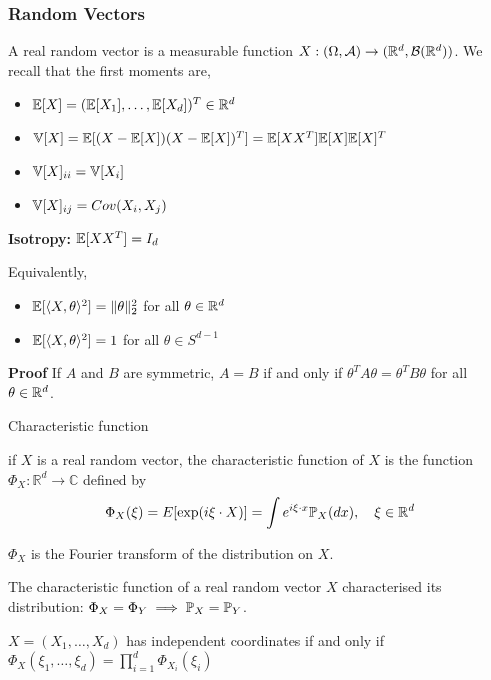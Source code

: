 \documentclass{beamer}
\begin{document}
  \begin{frame}
    \frametitle{Random Vectors}

    A real random vector is a measurable function $X:(\Omega,\cA) \to
    (\Rd,\cB(\Rd))$. We recall that the first moments are,

    \begin{itemize}
    \item $\E[X] = (\E[X_1], \ldots, \E[X_d])^T \in \Rd$
      \pause
      
    \item $\V[X] = \E[(X-\E[X])(X-\E[X])^T] =  \E[XX^T] \E[X]\E[X]^T$
      \pause
    \item $\V[X]_{ii} = \V[X_i]$
    \item $\V[X]_{ij} = Cov(X_i,X_j)$        
    \end{itemize}

    \pause

    \textbf{Isotropy:}  $\E[XX^T] = I_d$

    \pause

    Equivalently,   

    \begin{itemize}
    \item $\E[\langle X,\theta \rangle^2] = \|\theta\|_2^2$ for all $\theta \in
      \Rd$
    \item $\E[\langle X,\theta \rangle^2] = 1$ for all $\theta \in S^{d-1}$
    \end{itemize}

    \textbf{Proof} If $A$ and $B$ are symmetric, $A=B$ if and only if
    $\theta^TA\theta = \theta^TB\theta$ for all $\theta \in \Rd$.

  \end{frame}

  \begin{frame}{Characteristic function}

    \begin{definition}
      if $X$ is a real random vector, the characteristic function of $X$ is the function
      $\Phi_{X}: \mathbb{R}^{d} \longrightarrow \mathbb{C}$ defined by
      $$
      \Phi_{X}(\xi)=E[\exp (i \xi \cdot X)] = \int e^{i \xi \cdot x} \P_{X}(d x), \quad \xi \in \mathbb{R}^{d}
      $$

      $\Phi_{X}$ is the Fourier transform of the distribution on $X$.
    \end{definition}

    \pause

    \begin{theorem}
      The characteristic function of a real random vector $X$ characterised its
      distribution: $\Phi_X = \Phi_Y \implies \P_X = \P_Y$.
    \end{theorem}

    \pause

    
    \begin{proposition}
      $X=(X_1,\ldots,X_d)$ has independent coordinates if and only if \\
      $\Phi_{X}\left(\xi_{1}, \ldots, \xi_{d}\right)=\prod_{i=1}^{d}
      \Phi_{X_{i}}\left(\xi_{i}\right)$
    \end{proposition}
  \end{frame}
\end{document}
